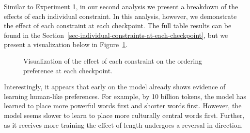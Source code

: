 \documentclass[
  10pt,
  nohyperref]{acl}
\begin{document}
Similar to Experiment 1, in our second analysis we present a breakdown
of the effects of each individual constraint. In this analysis, however,
we demonstrate the effect of each constraint at each checkpoint. The
full table results can be found in the
Section~\ref{sec-individual-constraints-at-each-checkpoint}, but we
present a visualization below in Figure~\ref{fig-exp2m2}.

\begin{figure}


\caption{\label{fig-exp2m2}Visualization of the effect of each
constraint on the ordering preference at each checkpoint.}

\end{figure}%

Interestingly, it appears that early on the model already shows evidence
of learning human-like preferences. For example, by 10 billion tokens,
the model has learned to place more powerful words first and shorter
words first. However, the model seems slower to learn to place more
culturally central words first. Further, as it receives more training
the effect of length undergoes a reversal in direction.
\end{document}
